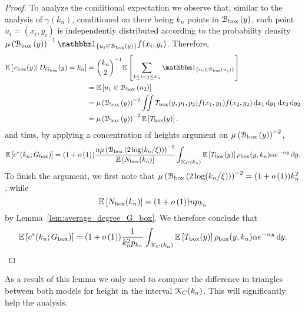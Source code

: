 \begin{proof}
To analyze the conditional expectation we observe that, similar to the analysis of $\gamma(k_n)$, conditioned on there being $k_n$ points in ${\mathcal B}_{\text{box}}\left(y\right)$, each point $u_i = (x_i,y_i)$ is independently distributed according to the probability density $\Mu{\BallPon{y}}^{-1} \ind{u_i \in \BallPon{y}} f(x_i,y_i)$. Therefore,
\begin{align*}
	\CExp{c_{\text{box}}(y)}{\Dbox(y) = k_n}
	&= \binom{k_n}{2}^{-1} \Exp{\sum_{1 \le i < j \le k_n} \ind{u_i \in \BallPon{u_j}}} \\
	&= \Exp{u_1 \in \BallPon{u_2}} \\
	&= \Mu{\BallPon{y}}^{-2} \iint T_{\text{box}}(y,p_1,p_2) f(x_1,y_1) f(x_2,y_2) 
		\dd x_1 \dd y_1 \dd x_2 \dd y_2\\
	&= \Mu{\BallPon{y}}^{-2} \Exp{T_{\text{box}}(y)}.
\end{align*}
and thus, by applying a concentration of heights argument on $\mu\left({\mathcal B}_{\text{box}}\left(y\right)\right)^{-2}$,
\[
	\mathbb{E}\left[c^\ast(k_n; G_{\mathrm{box}})\right] = (1 + o\left(1\right)) \frac{n \mu\left({\mathcal B}_{\text{box}}\left(2\log(k_n/\xi)\right)\right)^{-2}}{\mathbb{E}\left[N_{\text{box}}(k_n)\right]} \int_{{\mathcal K}_C(k_n)} \mathbb{E}\left[T_{\text{box}}(y)\right] \rho_{\mathrm{box}}(y,k_n) \alpha e^{-\alpha y} \operatorname{\mathrm{d}\hspace{-2pt}} y.
\]
To finish the argument, we first note that $\mu\left({\mathcal B}_{\text{box}}\left(2\log(k_n/\xi)\right)\right)^{-2} = (1+o\left(1\right))k_n^2$, while
\[
	\mathbb{E}\left[N_{\text{box}}(k_n)\right] = (1+o\left(1\right)) n p_{k_n}
\]
by Lemma~\ref{lem:average_degree_G_box}. We therefore conclude that
\[
	\mathbb{E}\left[c^\ast(k_n; G_{\mathrm{box}})\right] = (1 + o\left(1\right)) \frac{1}{k_n^2 p_{k_n}} \int_{{\mathcal K}_C(k_n)} 
		\mathbb{E}\left[T_{\text{box}}(y)\right] \rho_{\mathrm{box}}(y,k_n) \alpha e^{-\alpha y} \operatorname{\mathrm{d}\hspace{-2pt}} y.
\]
\end{proof}

As a result of this lemma we only need to compare the difference in triangles between both models for height in the interval ${\mathcal K}_C(k_n)$. This will significantly help the analysis.



%

